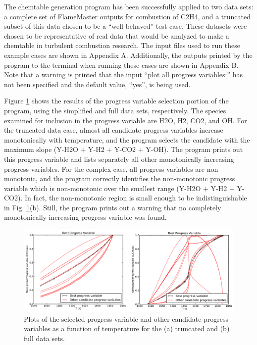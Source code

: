 \documentclass[11pt]{article}
\begin{document}
The chemtable generation program has been successfully applied to two
data sets: a complete set of FlameMaster outputs for combustion of
C2H4, and a truncated subset of this data chosen to be a
“well-behaved” test case. These datasets were chosen to be
representative of real data that would be analyzed to make a chemtable
in turbulent combustion research. The input files used to run these
example cases are shown in Appendix A. Additionally, the outputs
printed by the program to the terminal when running these cases are
shown in Appendix B. Note that a warning is printed that the input
“plot all progress variables:” has not been specified and the default
value, “yes”, is being used.

Figure \ref{fig:xa_xb} shows the results of the progress variable
selection portion of the program, using the simplified and full data
sets, respectively. The species examined for inclusion in the progress
variable are H2O, H2, CO2, and OH. For the truncated data case, almost
all candidate progress variables increase monotonically with
temperature, and the program selects the candidate with the maximum
slope (Y-H2O + Y-H2 + Y-CO2 + Y-OH). The program prints out this
progress variable and lists separately all other monotonically
increasing progress variables. For the complex case, all progress
variables are non-monotonic, and the program correctly identifies the
non-monotonic progress variable which is non-monotonic over the
smallest range (Y-H2O + Y-H2 + Y-CO2). In fact, the non-monotonic
region is small enough to be indistinguishable in
Fig. \ref{fig:xa_xb}(b). Still, the program prints out a warning that
no completely monotonically increasing progress variable was found.

\begin{figure} [h]
\centering
\includegraphics[width=\textwidth]{xa_xb.PNG}
\caption{\label{fig:xa_xb} Plots of the selected progress variable and
  other candidate progress variables as a function of temperature for
  the (a) truncated and (b) full data sets.  }
\end{figure}
\end{document}
